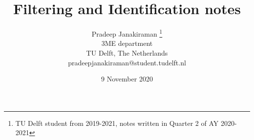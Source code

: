 \documentclass[a4paper, reqno, 12pt, openbib]{article} %
\begin{document}
\title{Filtering and Identification notes}
\author{Pradeep Janakiraman \thanks{TU Delft student from 2019-2021, notes written in Quarter 2 of AY 2020-2021}\\
3ME department\\
TU Delft, The Netherlands\\
pradeepjanakiraman@student.tudelft.nl}
\date{9 November 2020}
\maketitle
\newpage
\tableofcontents
\newpage


\end{document}
